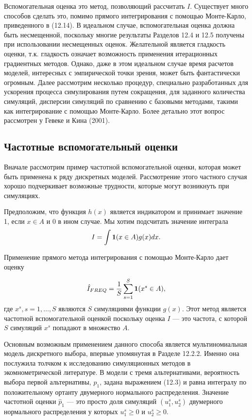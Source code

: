 Вспомогательная оценка это метод, позволяющий рассчитать $I$. Существует много способов сделать это, помимо прямого интегрирования с помощью Монте-Карло, приведенного в (12.14). В идеальном случае, вспомогательная оценка должна быть несмещенной, поскольку многие результаты Разделов 12.4 и 12.5 получены при использовании несмещенных оценок. Желательной является гладкость оценки, т.к. гладкость означает возможность применения итерационных градиентных методов. Однако, даже в этом идеальном случае время расчетов моделей, интересных с эмпирической точки зрения, может быть фантастически огромным. Далее рассмотрим несколько процедур, специально разработанных для ускорения процесса симулирования путем сокращения, для заданного количества симуляций, дисперсии симуляций по сравнению с базовыми методами, такими как интегрирование с помощью Монте-Карло. Более детально этот вопрос рассмотрен у Гевеке и Кина (2001).

\subsection{Частотные вспомогательный оценки}

Вначале рассмотрим пример частотной вспомогательной оценки, которая может быть применена к ряду дискретных моделей. Рассмотрение этого частного случая хорошо подчеркивает возможные трудности, которые могут возникнуть при симуляциях.

Предположим, что функция $h(x)$ является индикатором и принимает значение 1, если $x \in A$ и 0 в ином случае. Мы хотим подсчитать значение интеграла 
\[
I=\int{{\bf{1}}(x \in A)g(x)dx}.
\]

Применение прямого метода интегрирования с помощью Монте-Карло дает оценку

\[
\hat{I}_{FREQ}=\dfrac{1}{S}\sum^{S}_{s=1}{\bf{1}}(x^{s} \in A),
\]
где $x^s,s=1,\ldots ,S$ являются $S$ симуляциями функции $g(x)$. Этот метод является частотной вспомогательной оценкой поскольку оценка $I$ --- это частота, с которой $S$ симуляций $x^s$ попадают в  множество $A$. 

Основным возможным применением данного способа является мультиномиальная модель дискретного выбора, впервые упомянутая в Разделе 12.2.2. Именно она послужила толчком к исследованию симуляционных методов в экомнометрической литературе.  В модели с тремя альтернативами, вероятность выбора первой альтернативы, $p_1$, задана выражением (12.3) и равна интегралу по положительному ортанту двумерного нормального распределения. Значение частотной оценки $\hat{p}_1$ --- это просто доля симуляций $(u^{s}_1,u^{s}_2)$ двумерного нормального распределения у которых $u^{s}_1\geq 0$ и $u^{s}_2\geq 0$.

